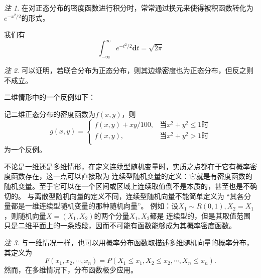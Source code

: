 \documentclass[a4paper,11pt]{article}%
\theoremstyle{remark}
\newtheorem*{remark}{注}
\theoremstyle{remark}
\theoremstyle{definition}
\theoremstyle{definition}
\theoremstyle{plain}
\begin{document}
\begin{remark}
    在对正态分布的密度函数进行积分时，常常通过换元来使得被积函数转化为$e^{-x^2/2}$的形式。

    我们有 
    \[\int_{-\infty}^{\infty}e^{-t^2/2}\mathbf{d}t=\sqrt{2\pi}\]
\end{remark}
\begin{remark}
    可以证明，若联合分布为正态分布，则其边缘密度也为正态分布，但反之则不成立。

    二维情形中的一个反例如下：

    记二维正态分布的密度函数为$f(x,y)$，则 
    \[ 
    g(x,y)=\begin{cases}
        f(x,y)+xy/100,& \text{当}x^2+y^2\leq 1\text{时}\\
        f(x,y),& \text{当}x^2+y^2> 1\text{时}\\
    \end{cases}     
    \]
    为一个反例。
\end{remark}
不论是一维还是多维情形，在定义连续型随机变量时，实质之点都在于它有概率密度函数存在，这一点可以直接取为
连续型随机变量的定义：它就是有密度函数的随机变量。至于它可以在一个区间或区域上连续取值倒不是本质的，甚至也是不确切的。
与离散型随机向量的定义不同，连续型随机向量不能简单定义为 ``其各分量都是一维连续型随机变量的那种随机向量''。
例如：设$X_1\sim R(0,1),X_2=X_1$，则随机向量$X=(X_1,X_2)$的两个分量$X_1,X_2$都是
连续型的，但是其取值范围只是二维平面上的一条线段，因而不可能有函数能够成为其概率密度函数。
\begin{remark}
    与一维情况一样，也可以用概率分布函数取描述多维随机向量的概率分布，其定义为
    \[F(x_1,x_2,\cdots,x_n)=P(X_1\leq x_1,X_2\leq x_2,\cdots,X_n\leq x_n).\]
    然而，在多维情况下，分布函数极少应用。
\end{remark}
\end{document}
